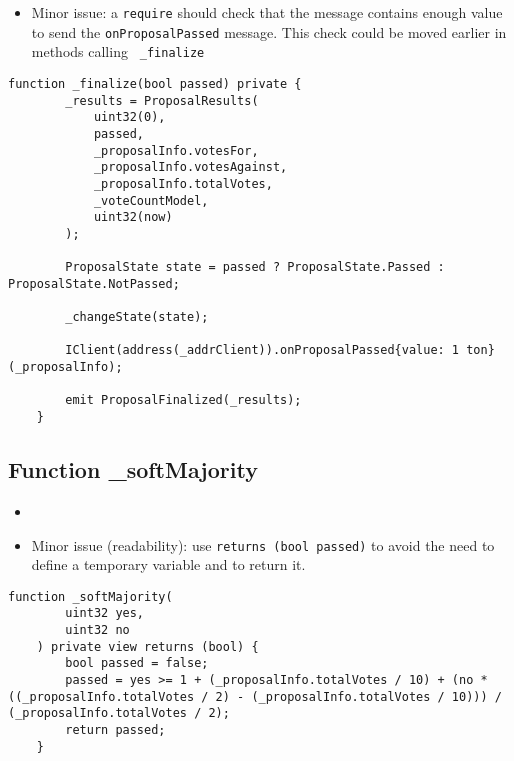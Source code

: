 \begin{itemize}
\item Minor issue: a {\tt require} should check that the message
  contains enough value to send the {\tt onProposalPassed}
  message. This check could be moved earlier in methods calling {\tt
    \_finalize}
\end{itemize}

\begin{lstlisting}[firstnumber=81]
    function _finalize(bool passed) private {
        _results = ProposalResults(
            uint32(0),
            passed,
            _proposalInfo.votesFor,
            _proposalInfo.votesAgainst,
            _proposalInfo.totalVotes,
            _voteCountModel,
            uint32(now)
        );

        ProposalState state = passed ? ProposalState.Passed : ProposalState.NotPassed;

        _changeState(state);

        IClient(address(_addrClient)).onProposalPassed{value: 1 ton} (_proposalInfo);

        emit ProposalFinalized(_results);
    }
\end{lstlisting}

\subsection{Function \_{}softMajority}

\begin{itemize}
\item {}
\item Minor issue (readability): use {\tt returns (bool passed)} to
  avoid the need to define a temporary variable and to return it.
\end{itemize}

\begin{lstlisting}[firstnumber=141]
    function _softMajority(
        uint32 yes,
        uint32 no
    ) private view returns (bool) {
        bool passed = false;
        passed = yes >= 1 + (_proposalInfo.totalVotes / 10) + (no * ((_proposalInfo.totalVotes / 2) - (_proposalInfo.totalVotes / 10))) / (_proposalInfo.totalVotes / 2);
        return passed;
    }
\end{lstlisting}

